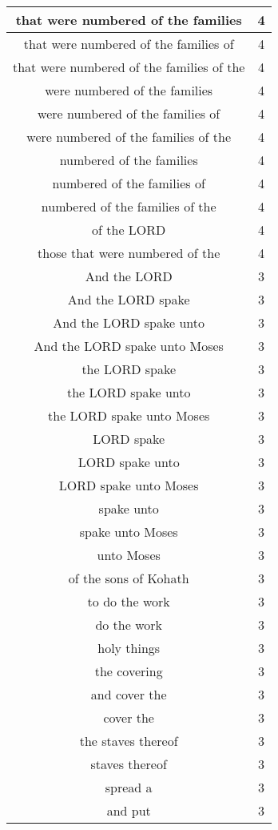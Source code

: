 \begin{center}
\begin{longtable}{|c|c|}
that were numbered of the families & 4\\ \hline 
that were numbered of the families of & 4\\ \hline 
that were numbered of the families of the & 4\\ \hline 
were numbered of the families & 4\\ \hline 
were numbered of the families of & 4\\ \hline 
were numbered of the families of the & 4\\ \hline 
numbered of the families & 4\\ \hline 
numbered of the families of & 4\\ \hline 
numbered of the families of the & 4\\ \hline 
of the LORD & 4\\ \hline 
those that were numbered of the & 4\\ \hline 
And the LORD & 3\\ \hline 
And the LORD spake & 3\\ \hline 
And the LORD spake unto & 3\\ \hline 
And the LORD spake unto Moses & 3\\ \hline 
the LORD spake & 3\\ \hline 
the LORD spake unto & 3\\ \hline 
the LORD spake unto Moses & 3\\ \hline 
LORD spake & 3\\ \hline 
LORD spake unto & 3\\ \hline 
LORD spake unto Moses & 3\\ \hline 
spake unto & 3\\ \hline 
spake unto Moses & 3\\ \hline 
unto Moses & 3\\ \hline 
of the sons of Kohath & 3\\ \hline 
to do the work & 3\\ \hline 
do the work & 3\\ \hline 
holy things & 3\\ \hline 
the covering & 3\\ \hline 
and cover the & 3\\ \hline 
cover the & 3\\ \hline 
the staves thereof & 3\\ \hline 
staves thereof & 3\\ \hline 
spread a & 3\\ \hline 
and put & 3\\ \hline 

\end{longtable}
\end{center}
